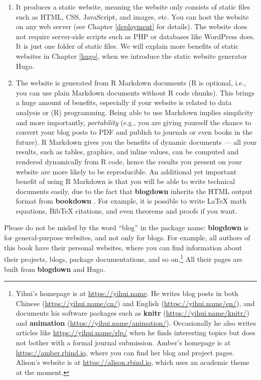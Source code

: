\documentclass[12pt,]{krantz}
\theoremstyle{definition}
\theoremstyle{definition}
\theoremstyle{definition}
\theoremstyle{remark}
\begin{document}
\begin{enumerate}
\def\labelenumi{\arabic{enumi}.}
\item
  It produces a static website, meaning the website only consists of
  static files such as HTML, CSS, JavaScript, and images, etc. You can
  host the website on any web server (see Chapter \ref{deployment} for
  details). The website does not require server-side scripts such as PHP
  or databases like WordPress does. It is just one folder of static
  files. We will explain more benefits of static websites in Chapter
  \ref{hugo}, when we introduce the static website generator Hugo.
\item
  The website is generated from R Markdown documents (R is optional,
  i.e., you can use plain Markdown documents without R code chunks).
  This brings a huge amount of benefits, especially if your website is
  related to data analysis or (R) programming. Being able to use
  Markdown implies simplicity and more importantly, \emph{portability}
  (e.g., you are giving yourself the chance to convert your blog posts
  to PDF and publish to journals or even books in the future). R
  Markdown gives you the benefits of dynamic documents --- all your
  results, such as tables, graphics, and inline values, can be computed
  and rendered dynamically from R code, hence the results you present on
  your website are more likely to be reproducible. An additional yet
  important benefit of using R Markdown is that you will be able to
  write technical documents easily, due to the fact that
  \textbf{blogdown} inherits the HTML output format from
  \textbf{bookdown} \citep{xie2016}. For example, it is possible to
  write LaTeX math equations, BibTeX citations, and even theorems and
  proofs if you want.
\end{enumerate}

Please do not be misled by the word ``blog'' in the package name:
\textbf{blogdown} is for general-purpose websites, and not only for
blogs. For example, all authors of this book have their personal
websites, where you can find information about their projects, blogs,
package documentations, and so on.\footnote{Yihui's homepage is at
  \url{https://yihui.name}. He writes blog posts in both Chinese
  (\url{https://yihui.name/cn/}) and English
  (\url{https://yihui.name/en/}), and documents his software packages
  such as \textbf{knitr} (\url{https://yihui.name/knitr/}) and
  \textbf{animation} (\url{https://yihui.name/animation/}). Occasionally
  he also writes articles like \url{https://yihui.name/rlp/} when he
  finds interesting topics but does not bother with a formal journal
  submission. Amber's homepage is at \url{https://amber.rbind.io}, where
  you can find her blog and project pages. Alison's website is at
  \url{https://alison.rbind.io}, which uses an academic theme at the
  moment.} All their pages are built from \textbf{blogdown} and Hugo.
\end{document}
